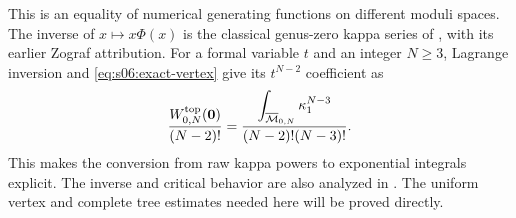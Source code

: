 \begin{rmk}
This is an equality of numerical generating functions on different
moduli spaces. The inverse of $x\mapsto x\Phi(x)$ is the classical
genus-zero kappa series of \cite[(0.8)]{KMZ96v1}, with its earlier
Zograf attribution. For a formal variable $t$ and an integer $N\geq3$,
Lagrange inversion and \eqref{eq:s06:exact-vertex} give its
$t^{N-2}$ coefficient as
\[
 \frac{W^{\rm top}_{0,N}(\mathbf0)}{(N-2)!}
 =\frac{\displaystyle\int_{\overline{\mathcal{M}}_{0,N}}\kappa_1^{N-3}}
        {(N-2)!(N-3)!}.
\]
This makes the conversion from raw kappa powers to exponential
integrals explicit. The inverse and critical behavior are also
analyzed in \cite[\S 6, Proof~6.3]{MaZ00}. The uniform vertex
and complete tree estimates needed here will be proved directly.
\end{rmk}
